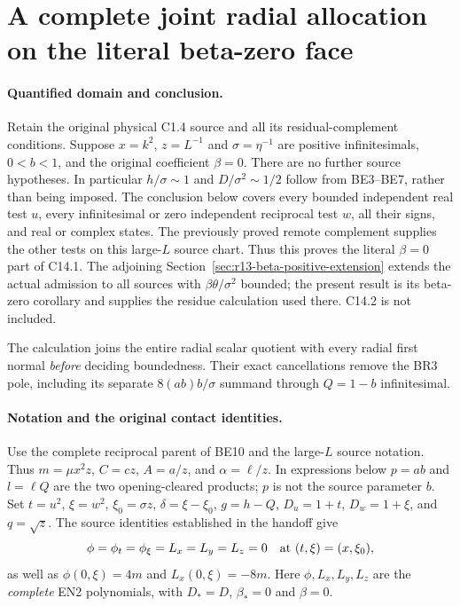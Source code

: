 \section{A complete joint radial allocation on the literal beta-zero face}
\label{sec:r13-joint-radial-beta-zero}

\paragraph{Quantified domain and conclusion.}
Retain the original physical C1.4 source and all its residual-complement
conditions. Suppose $x=k^2$, $z=L^{-1}$ and $\sigma=\eta^{-1}$ are
positive infinitesimals, $0<b<1$, and the original coefficient $\beta=0$.
There are no further source hypotheses. In particular $h/\sigma\sim1$
and $D/\sigma^2\sim1/2$ follow from BE3--BE7, rather than being imposed.
The conclusion below covers every bounded independent real test $u$,
every infinitesimal or zero independent reciprocal test $w$, all their
signs, and real or complex states. The previously proved remote
complement supplies the other tests on this large-$L$ source chart.
Thus this proves the literal $\beta=0$ part of C14.1. The adjoining
Section~\ref{sec:r13-beta-positive-extension} extends the actual admission
to all sources with $\beta\theta/\sigma^2$ bounded; the present result
is its beta-zero corollary and supplies the residue calculation used
there. C14.2 is not included.

The calculation joins the entire radial scalar quotient with every
radial first normal \emph{before} deciding boundedness. Their exact
cancellations remove the BR3 pole, including its separate
$8(ab)b/\sigma$ summand through $Q=1-b$ infinitesimal.

\paragraph{Notation and the original contact identities.}
Use the complete reciprocal parent of BE10 and the large-$L$ source
notation. Thus $m=\mu x^2z$, $C=cz$, $A=a/z$, and
$\alpha=\ell/z$. In expressions below $p=ab$ and $l=\ell Q$ are
the two opening-cleared products; $p$ is not the source parameter $b$.
Set $t=u^2$, $\xi=w^2$, $\xi_0=\sigma z$, $\delta=\xi-\xi_0$,
$g=h-Q$, $D_u=1+t$, $D_w=1+\xi$, and $q=\sqrt z$.
The source identities established in the handoff give
\[
 \phi=\phi_t=\phi_\xi=L_x=L_y=L_z=0
 \quad\hbox{at }(t,\xi)=(x,\xi_0),
\]
as well as $\phi(0,\xi)=4m$ and $L_x(0,\xi)=-8m$.
Here $\phi,L_x,L_y,L_z$ are the \emph{complete} EN2 polynomials,
with $D_*=D$, $\beta_*=0$ and $\beta=0$.

